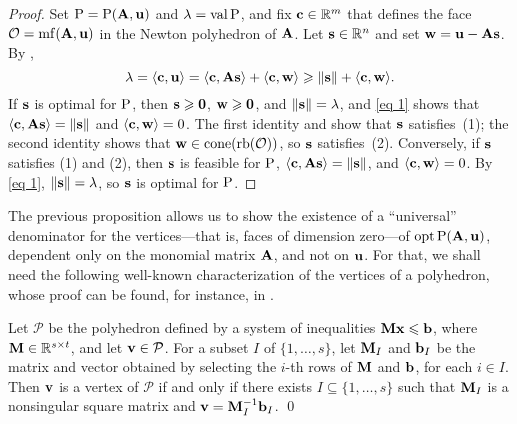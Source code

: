 \documentclass{amsart}
\begin{document}
\begin{proof}
   Set $\mathrm{P} = \mathrm{P}(\mathbf{A}, \mathbf{u})$ and $\lambda = \operatorname{val} \mathrm{P} $, and fix $\mathbf{c} \in \mathbb{R}^m$ that defines the face $\mathcal{O} = \operatorname{mf}(\mathbf{A}, \mathbf{u})$ in the Newton polyhedron of $\mathbf{A}$.
   Let $\mathbf{s} \in \mathbb{R}^n$ and set $\mathbf{w} = \mathbf{u} - \mathbf{A}\mathbf{s}$.
   By ,
   \begin{equation}\label{eq 1}
      \lambda = \langle \mathbf{c}, \mathbf{u} \rangle = \langle \mathbf{c}, \mathbf{A} \mathbf{s} \rangle + \langle \mathbf{c}, \mathbf{w} \rangle \geqslant \| \mathbf{s} \| + \langle \mathbf{c}, \mathbf{w} \rangle.
   \end{equation}
   If $\mathbf{s}$ is optimal for $\mathrm{P}$, then $\mathbf{s} \geqslant \mathbf{0}$, $\mathbf{w} \geqslant \mathbf{0}$, and $\| \mathbf{s} \| = \lambda$, and \eqref{eq 1} shows that $\langle \mathbf{c}, \mathbf{A} \mathbf{s} \rangle = \| \mathbf{s} \|$ and $\langle \mathbf{c}, \mathbf{w} \rangle = 0$.
   The first identity and  show that $\mathbf{s}$ satisfies~(1); the second identity shows that $\mathbf{w}\in \operatorname{cone}(\operatorname{rb}(\mathcal{O}))$, so $\mathbf{s}$ satisfies~(2).
   Conversely, if $\mathbf{s}$ satisfies (1) and (2), then $\mathbf{s}$ is feasible for $\mathrm{P}$, $\langle \mathbf{c}, \mathbf{A} \mathbf{s} \rangle = \| \mathbf{s} \|$, and $\langle \mathbf{c}, \mathbf{w} \rangle = 0$.
   By \eqref{eq 1}, $\| \mathbf{s} \| = \lambda$, so $\mathbf{s}$ is optimal for $\mathrm{P}$.
\end{proof}

The previous proposition allows us to show the existence of a ``universal'' denominator for the vertices---that is, faces of dimension zero---of $\operatorname{opt}\mathrm{P}(\mathbf{A},\mathbf{u})$, dependent only on the monomial matrix $\mathbf{A}$, and not on $\mathbf{u}$.
For that, we shall need the following well-known characterization of the vertices of a polyhedron, whose proof can be found, for instance, in \cite[Theorem~3.34]{conforti+etal.integer_programming}.

\begin{lemma}
   \label{prop: characterization of vertices}
   Let $\mathcal{P}$ be the polyhedron defined by a system of inequalities $\mathbf{M} \mathbf{x} \leqslant \mathbf{b}$, where $\mathbf{M}\in \mathbb{R}^{s\times t}$, and let $\mathbf{v} \in \mathcal{P}$.
   For a subset $I$ of $\{1,\ldots,s\}$, let $\mathbf{M}_I$ and $\mathbf{b}_I$ be the matrix and vector obtained by selecting the $i$-th rows of $\mathbf{M}$ and $\mathbf{b}$, for each $i\in I$.
   Then $\mathbf{v}$ is a vertex of $\mathcal{P}$ if and only if there exists $I \subseteq \{1,\ldots,s\}$ such that $\mathbf{M}_I$ is a nonsingular square matrix and $\mathbf{v} = \mathbf{M}_I^{-1}\mathbf{b}_I$.
\qed
\end{lemma}
\end{document}
